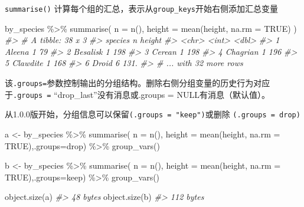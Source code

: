 \documentclass[
]{book}
\newenvironment{Shaded}{\begin{snugshade}}{\end{snugshade}}
\newcommand{\AttributeTok}[1]{\textcolor[rgb]{0.77,0.63,0.00}{#1}}
\newcommand{\CommentTok}[1]{\textcolor[rgb]{0.56,0.35,0.01}{\textit{#1}}}
\newcommand{\ConstantTok}[1]{\textcolor[rgb]{0.00,0.00,0.00}{#1}}
\newcommand{\FunctionTok}[1]{\textcolor[rgb]{0.00,0.00,0.00}{#1}}
\newcommand{\NormalTok}[1]{#1}
\newcommand{\OtherTok}[1]{\textcolor[rgb]{0.56,0.35,0.01}{#1}}
\newcommand{\SpecialCharTok}[1]{\textcolor[rgb]{0.00,0.00,0.00}{#1}}
\newcommand{\StringTok}[1]{\textcolor[rgb]{0.31,0.60,0.02}{#1}}
\begin{document}
\texttt{summarise()} 计算每个组的汇总，表示从\texttt{group\_keys}开始右侧添加汇总变量

\begin{Shaded}
\begin{Highlighting}[]
\NormalTok{by\_species }\SpecialCharTok{\%\textgreater{}\%}
  \FunctionTok{summarise}\NormalTok{(}
    \AttributeTok{n =} \FunctionTok{n}\NormalTok{(),}
    \AttributeTok{height =} \FunctionTok{mean}\NormalTok{(height, }\AttributeTok{na.rm =} \ConstantTok{TRUE}\NormalTok{)}
\NormalTok{  )}
\CommentTok{\#\textgreater{} \# A tibble: 38 x 3}
\CommentTok{\#\textgreater{}   species      n height}
\CommentTok{\#\textgreater{}   \textless{}chr\textgreater{}    \textless{}int\textgreater{}  \textless{}dbl\textgreater{}}
\CommentTok{\#\textgreater{} 1 Aleena       1    79 }
\CommentTok{\#\textgreater{} 2 Besalisk     1   198 }
\CommentTok{\#\textgreater{} 3 Cerean       1   198 }
\CommentTok{\#\textgreater{} 4 Chagrian     1   196 }
\CommentTok{\#\textgreater{} 5 Clawdite     1   168 }
\CommentTok{\#\textgreater{} 6 Droid        6   131.}
\CommentTok{\#\textgreater{} \# ... with 32 more rows}
\end{Highlighting}
\end{Shaded}

该\texttt{.groups=}参数控制输出的分组结构。删除右侧分组变量的历史行为对应于\texttt{.groups\ =} ``drop\_last''没有消息或.groups = NULL有消息（默认值）。

从1.0.0版开始，分组信息可以保留\texttt{(.groups\ =\ "keep")}或删除 \texttt{(.groups\ =\ \textquotesingle{}drop)}

\begin{Shaded}
\begin{Highlighting}[]
\NormalTok{a }\OtherTok{\textless{}{-}}\NormalTok{ by\_species }\SpecialCharTok{\%\textgreater{}\%}
  \FunctionTok{summarise}\NormalTok{(}
    \AttributeTok{n =} \FunctionTok{n}\NormalTok{(),}
    \AttributeTok{height =} \FunctionTok{mean}\NormalTok{(height, }\AttributeTok{na.rm =} \ConstantTok{TRUE}\NormalTok{),}\AttributeTok{.groups=}\StringTok{\textquotesingle{}drop\textquotesingle{}}\NormalTok{) }\SpecialCharTok{\%\textgreater{}\%} 
  \FunctionTok{group\_vars}\NormalTok{()}

\NormalTok{b }\OtherTok{\textless{}{-}}\NormalTok{ by\_species }\SpecialCharTok{\%\textgreater{}\%}
  \FunctionTok{summarise}\NormalTok{(}
    \AttributeTok{n =} \FunctionTok{n}\NormalTok{(),}
    \AttributeTok{height =} \FunctionTok{mean}\NormalTok{(height, }\AttributeTok{na.rm =} \ConstantTok{TRUE}\NormalTok{),}\AttributeTok{.groups=}\StringTok{\textquotesingle{}keep\textquotesingle{}}\NormalTok{) }\SpecialCharTok{\%\textgreater{}\%} 
  \FunctionTok{group\_vars}\NormalTok{()}

\FunctionTok{object.size}\NormalTok{(a)}
\CommentTok{\#\textgreater{} 48 bytes}
\FunctionTok{object.size}\NormalTok{(b)}
\CommentTok{\#\textgreater{} 112 bytes}
\end{Highlighting}
\end{Shaded}
\end{document}
